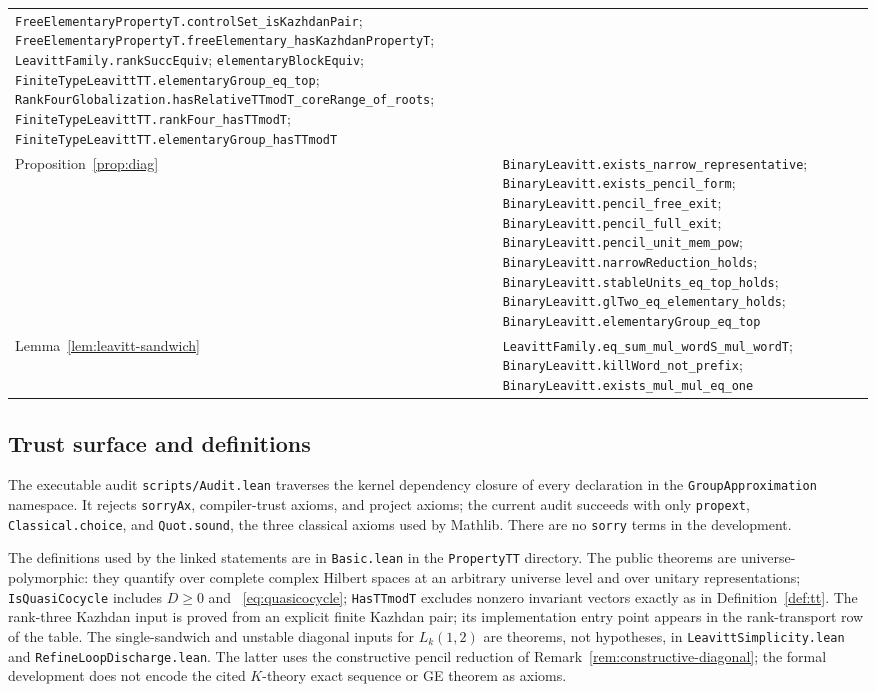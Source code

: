 \documentclass[11pt]{amsart}
\theoremstyle{definition}
\theoremstyle{plain}
\begin{document}
\begin{tabularx}{\textwidth}{@{}>{\raggedright\arraybackslash}p{}>{\raggedright\arraybackslash}X@{}}
\nolinkurl{FreeElementaryPropertyT.controlSet_isKazhdanPair};
\nolinkurl{FreeElementaryPropertyT.freeElementary_hasKazhdanPropertyT};
\nolinkurl{LeavittFamily.rankSuccEquiv};
\nolinkurl{elementaryBlockEquiv};
\nolinkurl{FiniteTypeLeavittTT.elementaryGroup_eq_top};
\nolinkurl{RankFourGlobalization.hasRelativeTTmodT_coreRange_of_roots};
\nolinkurl{FiniteTypeLeavittTT.rankFour_hasTTmodT};
\nolinkurl{FiniteTypeLeavittTT.elementaryGroup_hasTTmodT} \\
Proposition~\ref{prop:diag} &
\nolinkurl{BinaryLeavitt.exists_narrow_representative};
\nolinkurl{BinaryLeavitt.exists_pencil_form};
\nolinkurl{BinaryLeavitt.pencil_free_exit};
\nolinkurl{BinaryLeavitt.pencil_full_exit};
\nolinkurl{BinaryLeavitt.pencil_unit_mem_pow};
\nolinkurl{BinaryLeavitt.narrowReduction_holds};
\nolinkurl{BinaryLeavitt.stableUnits_eq_top_holds};
\nolinkurl{BinaryLeavitt.glTwo_eq_elementary_holds};
\nolinkurl{BinaryLeavitt.elementaryGroup_eq_top} \\
Lemma~\ref{lem:leavitt-sandwich} &
\nolinkurl{LeavittFamily.eq_sum_mul_wordS_mul_wordT};
\nolinkurl{BinaryLeavitt.killWord_not_prefix};
\nolinkurl{BinaryLeavitt.exists_mul_mul_eq_one} \\
\bottomrule
\end{tabularx}
\endgroup

\subsection*{Trust surface and definitions}

The executable audit \nolinkurl{scripts/Audit.lean} traverses the
kernel dependency closure of every declaration in the
\nolinkurl{GroupApproximation} namespace.  It rejects
\nolinkurl{sorryAx}, compiler-trust axioms, and project axioms; the
current audit succeeds with only \nolinkurl{propext},
\nolinkurl{Classical.choice}, and \nolinkurl{Quot.sound}, the three
classical axioms used by Mathlib.  There are no \nolinkurl{sorry}
terms in the development.

The definitions used by the linked statements are in
\nolinkurl{Basic.lean} in the \nolinkurl{PropertyTT} directory.  The public
theorems are universe-polymorphic: they quantify over complete complex
Hilbert spaces at an arbitrary universe level and over unitary representations;
\nolinkurl{IsQuasiCocycle} includes \(D\ge0\) and
~\eqref{eq:quasicocycle}; \nolinkurl{HasTTmodT} excludes nonzero
invariant vectors exactly as in Definition~\ref{def:tt}.  The
rank-three Kazhdan input is proved from an explicit finite Kazhdan
pair; its implementation entry point appears in the rank-transport
row of the table.
The single-sandwich and unstable diagonal inputs for \(L_k(1,2)\) are
theorems, not hypotheses, in \nolinkurl{LeavittSimplicity.lean} and
\nolinkurl{RefineLoopDischarge.lean}.
The latter uses the constructive pencil reduction of
Remark~\ref{rem:constructive-diagonal}; the formal development does
not encode the cited \(K\)-theory exact sequence or GE theorem as
axioms.
\end{document}
